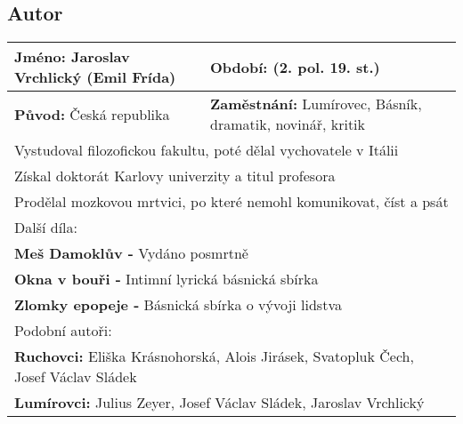 \subsection*{Autor}
\begin{tabularx}{\linewidth}{l|l}
    \textbf{Jméno:} Jaroslav Vrchlický (Emil Frída) & \textbf{Období:} (2. pol. 19. st.)                                \\
    \hline
    \textbf{Původ:} Česká republika                 & \textbf{Zaměstnání:} Lumírovec, Básník, dramatik, novinář, kritik \\
    \hline
    \multicolumn{2}{l}{Vystudoval filozofickou fakultu, poté dělal vychovatele v Itálii}                                \\
    \multicolumn{2}{l}{Získal doktorát Karlovy univerzity a titul profesora}                                            \\
    \multicolumn{2}{l}{Prodělal mozkovou mrtvici, po které nemohl komunikovat, číst a psát}                             \\
    \hline
    \multicolumn{2}{l}{Další díla:}                                                                                     \\
    \multicolumn{2}{l}{\textbf{Meš Damoklův -} Vydáno posmrtně}                                                         \\
    \multicolumn{2}{l}{\textbf{Okna v bouři -} Intimní lyrická básnická sbírka}                                         \\
    \multicolumn{2}{l}{\textbf{Zlomky epopeje -} Básnická sbírka o vývoji lidstva}                                      \\
    \hline
    \multicolumn{2}{l}{Podobní autoři:}                                                                                 \\
    \multicolumn{2}{l}{\textbf{Ruchovci:} Eliška Krásnohorská, Alois Jirásek, Svatopluk Čech, Josef Václav Sládek}     \\
    \multicolumn{2}{l}{\textbf{Lumírovci:} Julius Zeyer, Josef Václav Sládek, Jaroslav Vrchlický}                       \\
\end{tabularx}

